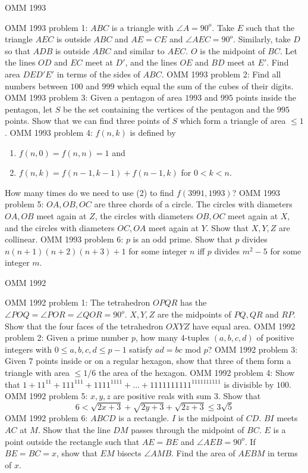 OMM 1993 

OMM 1993 problem 1:  $ABC$ is a triangle with $\angle A = 90^o$. Take $E$ such that the triangle $AEC$ is outside $ABC$ and $AE = CE$ and $\angle AEC = 90^o$. Similarly, take $D$ so that $ADB$ is outside $ABC$ and similar to $AEC$. $O$ is the midpoint of $BC$. Let the lines $OD$ and $EC$ meet at $D'$, and the lines $OE$ and $BD$ meet at $E'$. Find area $DED'E'$ in terms of the sides of $ABC$. 
OMM 1993 problem 2:  Find all numbers between $100$ and $999$ which equal the sum of the cubes of their digits. 
OMM 1993 problem 3:  Given a pentagon of area $1993$ and $995$ points inside the pentagon, let $S$ be the set containing the vertices of the pentagon and the $995$ points. Show that we can find three points of $S$ which form a triangle of area $\le 1$. 
OMM 1993 problem 4:  $f(n,k)$ is defined by
\begin{enumerate}[(1)]
  \item $f(n,0) = f(n,n) = 1$ and
  \item $f(n,k) = f(n-1,k-1) + f(n-1,k)$ for $0 < k < n$.
\end{enumerate}
How many times do we need to use (2) to find $f(3991,1993)$? 
OMM 1993 problem 5:  $OA, OB, OC$ are three chords of a circle. The circles with diameters $OA, OB$ meet again at $Z$, the circles with diameters $OB, OC$ meet again at $X$, and the circles with diameters $OC, OA$ meet again at $Y$. Show that $X, Y, Z$ are collinear. 
OMM 1993 problem 6:  $p$ is an odd prime. Show that $p$ divides $n(n+1)(n+2)(n+3) + 1$ for some integer $n$ iff $p$ divides $m^2 - 5$ for some integer $m$. 

OMM 1992 

OMM 1992 problem 1:  The tetrahedron $OPQR$ has the $\angle POQ = \angle POR = \angle QOR = 90^o$. $X, Y, Z$ are the midpoints of $PQ, QR$ and $RP.$ Show that the four faces of the tetrahedron $OXYZ$ have equal area. 
OMM 1992 problem 2:  Given a prime number $p$, how many $4$-tuples $(a, b, c, d)$ of positive integers with $0 \le a, b, c, d \le p-1$ satisfy $ad = bc$ mod $p$? 
OMM 1992 problem 3:  Given $7$ points inside or on a regular hexagon, show that three of them form a triangle with area $\le 1/6$ the area of the hexagon. 
OMM 1992 problem 4:  Show that $1 + 11^{11} + 111^{111} + 1111^{1111} +...+ 1111111111^{1111111111}$ is divisible by $100$. 
OMM 1992 problem 5:  $x, y, z$ are positive reals with sum $3$. Show that
\[ 6 < \sqrt{2x+3} + \sqrt{2y+3} + \sqrt{2z+3}\le 3\sqrt5 \] 
OMM 1992 problem 6:  $ABCD$ is a rectangle. $I$ is the midpoint of $CD$. $BI$ meets $AC$ at $M$. Show that the line $DM$ passes through the midpoint of $BC$. $E$ is a point outside the rectangle such that $AE = BE$ and $\angle AEB = 90^o$. If $BE = BC = x$, show that $EM$ bisects $\angle AMB$. Find the area of $AEBM$ in terms of $x$. 

